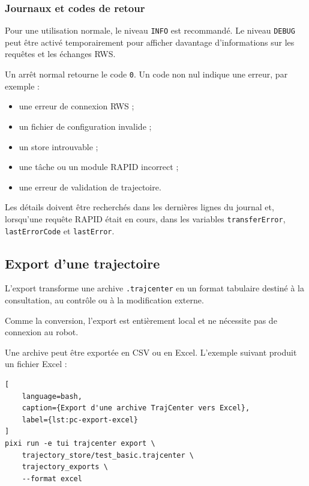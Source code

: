 \documentclass{rapportENSAM}
\begin{document}
\subsubsection{Journaux et codes de retour}
\label{subsubsec:pc-supervisor-logs}

Pour une utilisation normale, le niveau \texttt{INFO} est recommandé. Le
niveau \texttt{DEBUG} peut être activé temporairement pour afficher davantage
d'informations sur les requêtes et les échanges RWS.

Un arrêt normal retourne le code \texttt{0}. Un code non nul indique une
erreur, par exemple :

\begin{itemize}
    \item une erreur de connexion RWS ;
    \item un fichier de configuration invalide ;
    \item un store introuvable ;
    \item une tâche ou un module RAPID incorrect ;
    \item une erreur de validation de trajectoire.
\end{itemize}

Les détails doivent être recherchés dans les dernières lignes du journal et,
lorsqu'une requête RAPID était en cours, dans les variables
\texttt{transferError}, \texttt{lastErrorCode} et \texttt{lastError}.



\subsection{Export d'une trajectoire}
\label{subsec:pc-export}

L'export transforme une archive \texttt{.trajcenter} en un format tabulaire
destiné à la consultation, au contrôle ou à la modification externe.

Comme la conversion, l'export est entièrement local et ne nécessite pas de
connexion au robot.

Une archive peut être exportée en CSV ou en Excel. L'exemple suivant produit
un fichier Excel :

\begin{lstlisting}[
    language=bash,
    caption={Export d'une archive TrajCenter vers Excel},
    label={lst:pc-export-excel}
]
pixi run -e tui trajcenter export \
    trajectory_store/test_basic.trajcenter \
    trajectory_exports \
    --format excel
\end{lstlisting}
\end{document}
